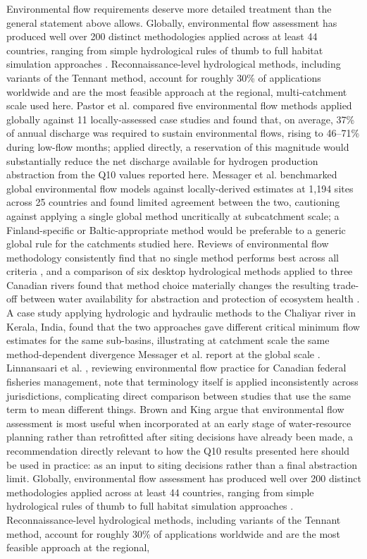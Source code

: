 \documentclass[draft]{agujournal2019}
\begin{document}
Environmental flow requirements deserve more detailed treatment than the general statement above allows. Globally, environmental flow assessment has produced well over 200 distinct methodologies applied across at least 44 countries, ranging from simple hydrological rules of thumb to full habitat simulation approaches \cite{Tharme2003}. Reconnaissance-level hydrological methods, including variants of the Tennant method, account for roughly 30\% of applications worldwide \cite{Tharme2003} and are the most feasible approach at the regional, multi-catchment scale used here. Pastor et al.  compared five environmental flow methods applied globally against 11 locally-assessed case studies and found that, on average, 37\% of annual discharge was required to sustain environmental flows, rising to 46--71\% during low-flow months; applied directly, a reservation of this magnitude would substantially reduce the net discharge available for hydrogen production abstraction from the Q10 values reported here. Messager et al.  benchmarked global environmental flow models against locally-derived estimates at 1,194 sites across 25 countries and found limited agreement between the two, cautioning against applying a single global method uncritically at subcatchment scale; a Finland-specific or Baltic-appropriate method would be preferable to a generic global rule for the catchments studied here. Reviews of environmental flow methodology consistently find that no single method performs best across all criteria \cite{Gopal2013}, and a comparison of six desktop hydrological methods applied to three Canadian rivers found that method choice materially changes the resulting trade-off between water availability for abstraction and protection of ecosystem health \cite{HatfieldPaul2015}. A case study applying hydrologic and hydraulic methods to the Chaliyar river in Kerala, India, found that the two approaches gave different critical minimum flow estimates for the same sub-basins, illustrating at catchment scale the same method-dependent divergence Messager et al. report at the global scale \cite{SachinRameshThampi2023}. Linnansaari et al. , reviewing environmental flow practice for Canadian federal fisheries management, note that terminology itself is applied inconsistently across jurisdictions, complicating direct comparison between studies that use the same term to mean different things. Brown and King  argue that environmental flow assessment is most useful when incorporated at an early stage of water-resource planning rather than retrofitted after siting decisions have already been made, a recommendation directly relevant to how the Q10 results presented here should be used in practice: as an input to siting decisions rather than a final abstraction limit. Globally, environmental flow assessment has produced well over 200 distinct methodologies applied across at least 44 countries, ranging from simple hydrological rules of thumb to full habitat simulation approaches \cite{Tharme2003}. Reconnaissance-level hydrological methods, including variants of the Tennant method, account for roughly 30\% of applications worldwide \cite{Tharme2003} and are the most feasible approach at the regional, 
\end{document}
